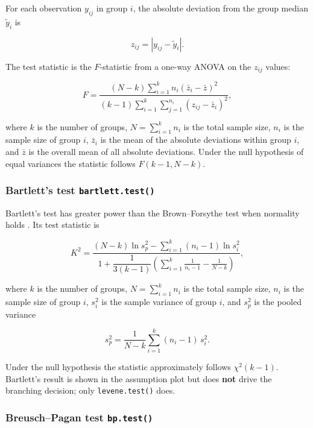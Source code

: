For each observation \(y_{ij}\) in group \(i\), the absolute deviation from
the group median \(\tilde{y}_i\) is

\[z_{ij} = |y_{ij} - \tilde{y}_i|.\]

The test statistic is the \(F\)-statistic from a one-way ANOVA on the
\(z_{ij}\) values:

\[F = \frac{(N-k)\displaystyle\sum_{i=1}^{k} n_i (\bar{z}_i - \bar{z})^2}
           {(k-1)\displaystyle\sum_{i=1}^{k}\sum_{j=1}^{n_i}(z_{ij} - \bar{z}_i)^2},\]

where \(k\) is the number of groups, \(N = \sum_{i=1}^k n_i\) is the total
sample size, \(n_i\) is the sample size of group \(i\), \(\bar{z}_i\) is the
mean of the absolute deviations within group \(i\), and \(\bar{z}\) is the
overall mean of all absolute deviations. Under the null hypothesis of
equal variances the statistic follows \(F(k-1, N-k)\).

\subsubsection{\texorpdfstring{Bartlett's test \texttt{bartlett.test()}}{Bartlett's test bartlett.test()}}\label{bart}

Bartlett's test \citep{Bartlett:1937} has greater power than the
Brown--Forsythe test when normality holds \citep{Allingham:2012}. Its test
statistic is

\[K^2 = \frac{(N-k)\ln s_p^2 - \displaystyle\sum_{i=1}^k (n_i-1)\ln s_i^2}
{1 + \dfrac{1}{3(k-1)}\!\left(\displaystyle\sum_{i=1}^k \frac{1}{n_i-1} - \frac{1}{N-k}\right)},\]

where \(k\) is the number of groups, \(N = \sum_{i=1}^k n_i\) is the total
sample size, \(n_i\) is the sample size of group \(i\), \(s_i^2\) is the sample
variance of group \(i\), and \(s_p^2\) is the pooled variance

\[s_p^2 = \frac{1}{N-k}\sum_{i=1}^k (n_i-1)\,s_i^2.\]

Under the null hypothesis the statistic approximately follows
\(\chi^2(k-1)\). Bartlett's result is shown in the assumption plot but
does \textbf{not} drive the branching decision; only \texttt{levene.test()} does.

\subsubsection{\texorpdfstring{Breusch--Pagan test \texttt{bp.test()}}{Breusch--Pagan test bp.test()}}\label{bp}

